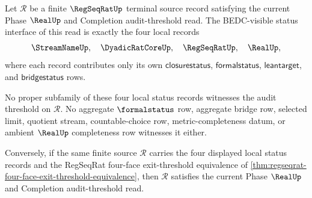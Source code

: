 \begin{theorem}
\label{thm:regseqrat-audit-threshold-face-status-minimality}
Let $\mathcal R$ be a finite $\RegSeqRatUp$ terminal source record satisfying the current Phase $\RealUp$ and Completion audit-threshold read. The BEDC-visible status interface of this read is exactly the four local records
$$
\StreamNameUp,\quad \DyadicRatCoreUp,\quad \RegSeqRatUp,\quad \RealUp,
$$
where each record contributes only its own $\mathsf{closurestatus}$, $\mathsf{formalstatus}$, $\mathsf{leantarget}$, and $\mathsf{bridgestatus}$ rows.

No proper subfamily of these four local status records witnesses the audit threshold on $\mathcal R$. No aggregate $\formalstatus$ row, aggregate bridge row, selected limit, quotient stream, countable-choice row, metric-completeness datum, or ambient $\RealUp$ completeness row witnesses it either.

Conversely, if the same finite source $\mathcal R$ carries the four displayed local status records and the RegSeqRat four-face exit-threshold equivalence of \autoref{thm:regseqrat-four-face-exit-threshold-equivalence}, then $\mathcal R$ satisfies the current Phase $\RealUp$ and Completion audit-threshold read.
\end{theorem}
